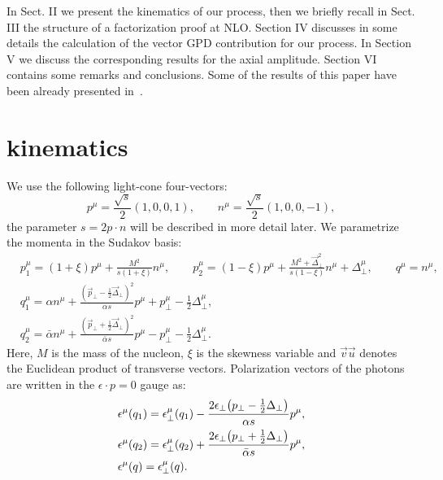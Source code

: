 \documentclass[aps,prd,superscriptaddress,floatfix,showpacs]{revtex4}
\begin{document}
In Sect. II we present the kinematics of our process, then we briefly recall in Sect. III  the structure of a factorization proof at NLO. Section IV discusses in some details the calculation of the vector GPD contribution %
for our process. In Section V we discuss the corresponding results for the axial amplitude. Section VI contains some remarks and conclusions. Some of the results of this paper have been already %
presented in~\cite{Grocholski:2021dgi,Grocholski:2021gta}. 
%
\section{kinematics}
\label{sec_kinematics}
We use the following light-cone four-vectors:
\begin{equation}
p^\mu = \frac{\sqrt{s}}{2}(1,0,0,1), \quad \quad n^\mu =  \frac{\sqrt{s}}{2}(1,0,0,-1),
\end{equation}
the parameter $s= 2 p\cdot n$ will be described in more detail later.
We parametrize %
the momenta in the Sudakov basis:
\begin{equation}
\begin{aligned}
&p_1^\mu = (1+\xi)p^\mu + \frac{M^2}{s(1+\xi)}n^\mu, \qquad p_2^\mu = (1-\xi)p^\mu + \frac{M^2 + \vec{\Delta}_\perp^2}{s(1-\xi)}n^\mu + \Delta_\perp^\mu, \qquad q^\mu = n^\mu,
\\
&q_1^\mu = \alpha n^\mu + \frac{(\vec{p}_\perp-\frac{1}{2}\vec{\Delta}_\perp)^2}{\alpha s} p^\mu + p_\perp^\mu - \frac{1}{2}\Delta_\perp^\mu,
\\
&q_2^\mu = \bar{\alpha} n^\mu + \frac{(\vec{p}_\perp+\frac{1}{2}\vec{\Delta}_\perp)^2}{\bar{\alpha} s} p^\mu - p_\perp^\mu - \frac{1}{2}\Delta_\perp^\mu.
\end{aligned}
\end{equation}
Here, $M$ is the mass of the nucleon, $\xi$ is the skewness variable and $\vec{v}\vec{u}$ denotes the Euclidean product of transverse vectors. %
Polarization vectors of the photons are written in the $\epsilon \cdot p =0$ gauge %
as:
\begin{equation}
\begin{aligned}
&\epsilon^\mu(q_1) = \epsilon_\perp^\mu(q_1) - \frac{2\epsilon_\perp\big{(}p_\perp - \frac{1}{2}\Delta_\perp\big{)}}{\alpha s}p^\mu,
\\
&\epsilon^\mu(q_2) = \epsilon_\perp^\mu(q_2) + \frac{2\epsilon_\perp\big{(}p_\perp + \frac{1}{2}\Delta_\perp\big{)}}{\bar{\alpha} s}p^\mu,
\\
&\epsilon^\mu(q) = \epsilon_\perp^\mu(q).
\end{aligned}
\end{equation}
\end{document}

